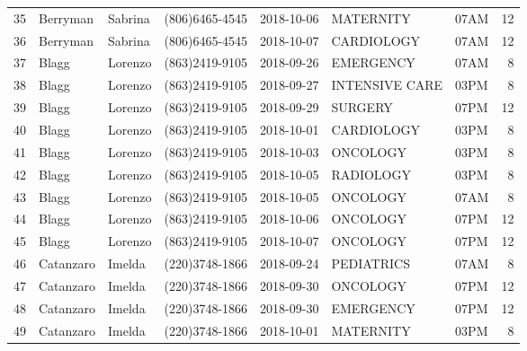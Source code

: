 \documentclass[11pt]{article}
\begin{document}
\begin{tabular}{|l|l|l|l|l|l|l|r|}
	35 &   Berryman &  Sabrina &  (806)6465-4545 &  2018-10-06 &       MATERNITY &  07AM &            12 \\
	36 &   Berryman &  Sabrina &  (806)6465-4545 &  2018-10-07 &      CARDIOLOGY &  07AM &            12 \\
	37 &      Blagg &  Lorenzo &  (863)2419-9105 &  2018-09-26 &       EMERGENCY &  07AM &             8 \\
	38 &      Blagg &  Lorenzo &  (863)2419-9105 &  2018-09-27 &  INTENSIVE CARE &  03PM &             8 \\
	39 &      Blagg &  Lorenzo &  (863)2419-9105 &  2018-09-29 &         SURGERY &  07PM &            12 \\
	40 &      Blagg &  Lorenzo &  (863)2419-9105 &  2018-10-01 &      CARDIOLOGY &  03PM &             8 \\
	41 &      Blagg &  Lorenzo &  (863)2419-9105 &  2018-10-03 &        ONCOLOGY &  03PM &             8 \\
	42 &      Blagg &  Lorenzo &  (863)2419-9105 &  2018-10-05 &       RADIOLOGY &  03PM &             8 \\
	43 &      Blagg &  Lorenzo &  (863)2419-9105 &  2018-10-05 &        ONCOLOGY &  07AM &             8 \\
	44 &      Blagg &  Lorenzo &  (863)2419-9105 &  2018-10-06 &        ONCOLOGY &  07PM &            12 \\
	45 &      Blagg &  Lorenzo &  (863)2419-9105 &  2018-10-07 &        ONCOLOGY &  07PM &            12 \\
	46 &  Catanzaro &   Imelda &  (220)3748-1866 &  2018-09-24 &      PEDIATRICS &  07AM &             8 \\
	47 &  Catanzaro &   Imelda &  (220)3748-1866 &  2018-09-30 &        ONCOLOGY &  07PM &            12 \\
	48 &  Catanzaro &   Imelda &  (220)3748-1866 &  2018-09-30 &       EMERGENCY &  07PM &            12 \\
	49 &  Catanzaro &   Imelda &  (220)3748-1866 &  2018-10-01 &       MATERNITY &  03PM &             8 \\
	\bottomrule
\end{tabular}

	
    
    
    
    
\end{document}
